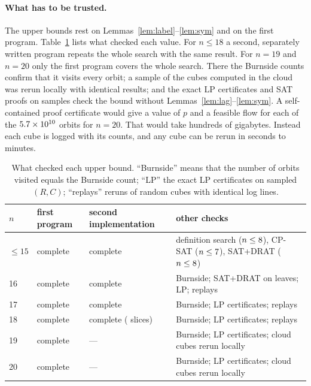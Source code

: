 \documentclass[11pt]{article}
\theoremstyle{remark}
\begin{document}
\paragraph{What has to be trusted.} The upper bounds rest on Lemmas~\ref{lem:label}--\ref{lem:sym} and
on the first program. Table~\ref{tab:cover} lists what checked each value. For $n\le18$ a second,
separately written program repeats the whole search with the same result. For $n=19$ and $n=20$ only the first program covers the whole search. There the Burnside counts
confirm that it visits every orbit; a sample of the cubes computed in the cloud was rerun locally with
identical results; and the exact LP certificates and SAT proofs on samples check the bound without
Lemmas~\ref{lem:lag}--\ref{lem:sym}. A self-contained proof certificate would give a value of $p$ and a
feasible flow for each of the $5.7\times10^{10}$ orbits for $n=20$. That would take hundreds of
gigabytes. Instead each cube is logged with its counts, and any cube can be rerun in seconds to minutes.

\begin{table}[!ht]
\centering\small
\begin{tabular}{l>{\raggedright}p{2.1cm}>{\raggedright}p{3.4cm}>{\raggedright\arraybackslash}p{7.2cm}}
\toprule
$n$ & first program & second implementation & other checks\\\midrule
$\le15$ & complete & complete & definition search ($n\le8$), CP-SAT ($n\le7$), SAT+DRAT ($n\le8$)\\
16 & complete & complete & Burnside; SAT+DRAT on \clSatSixteenLeaves{} leaves; LP; replays\\
17 & complete & complete & Burnside; LP certificates; replays\\
18 & complete & complete (\clPqvPartsEighteen{} slices) & Burnside; LP certificates; replays\\
19 & complete & --- & Burnside; LP certificates; \clReplayNineteen{} cloud cubes rerun locally\\
20 & complete & --- & Burnside; LP certificates; \clReplayTwenty{} cloud cubes rerun locally\\
\bottomrule
\end{tabular}
\caption{What checked each upper bound. ``Burnside'' means that the number of orbits visited equals the
Burnside count; ``LP'' the exact LP certificates on sampled $(R,C)$; ``replays'' reruns of random cubes
with identical log lines.}
\label{tab:cover}
\end{table}
\end{document}
